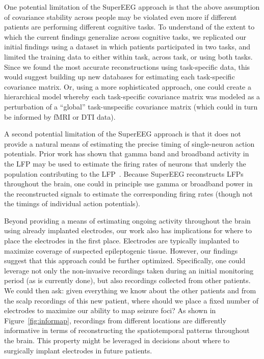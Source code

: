 \documentclass[11pt]{article}
\begin{document}
One potential limitation of the SuperEEG approach is that the above
assumption of covariance stability across people may be violated even
more if different patients are performing different cognitive tasks.
To understand of the extent to which the current findings generalize across
cognitive tasks, we replicated our initial findings using a dataset in which patients participated in two tasks, and limited the training data to either within task, across task, or using both tasks. Since we found the most accurate reconstructions using task-specific data, this would suggest building up new databases for estimating each task-specific covariance
matrix.  Or, using a more sophisticated approach, one could create a
hierarchical model whereby each task-specific covariance matrix was
modeled as a perturbation of a ``global'' task-unspecific covariance
matrix (which could in turn be informed by fMRI or DTI data).

A second potential limitation of the SuperEEG approach is that it
does not provide a natural means of estimating the precise timing of
single-neuron action potentials.  Prior work has shown that gamma band
and broadband activity in the LFP may be used to estimate the firing
rates of neurons that underly the population contributing to the
LFP~\cite{MannEtal09}.  Because SuperEEG reconstructs LFPs throughout
the brain, one could in principle use gamma or broadband power in the
reconstructed signals to estimate the corresponding firing rates
(though not the timings of individual action potentials).

Beyond providing a means of estimating ongoing activity throughout the
brain using already implanted electrodes, our work also has
implications for where to place the electrodes in the first place.
Electrodes are typically implanted to maximize coverage of suspected
epileptogenic tissue.  However, our findings suggest that this approach
could be further optimized.  Specifically, one could leverage not only
the non-invasive recordings taken during an initial monitoring period
(as is currently done), but also recordings collected from other
patients.  We could then ask: given everything we know about the other
patients and from the scalp recordings of this new patient, where
should we place a fixed number of electrodes to maximize our ability
to map seizure foci?  As shown in Figure~\ref{fig:informap}, recordings
from different locations are differently informative in terms of
reconstructing the spatiotemporal patterns throughout the brain.
This property might be leveraged in decisions about where to
surgically implant electrodes in future patients.
\end{document}

